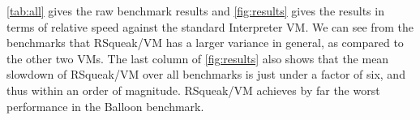 \documentclass[
10pt,          %
]{sigplanconf}
\begin{document}
\autoref{tab:all} gives the raw benchmark results and \autoref{fig:results}
gives the results in terms of relative speed against the standard Interpreter
\ac{VM}. We can see from the benchmarks that RSqueak/VM has a larger variance
in general, as compared to the other two \acp{VM}. The last column of
\autoref{fig:results} also shows that the mean slowdown of RSqueak/VM over all
benchmarks is just under a factor of six, and thus within an order of
magnitude. RSqueak/VM achieves by far the worst performance in the Balloon
benchmark.





\end{document}
